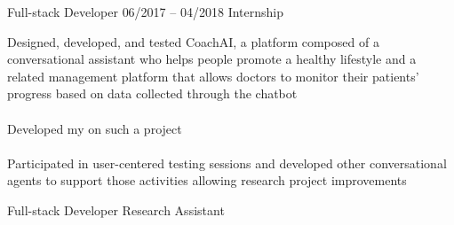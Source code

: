 \documentclass[9pt, green]{template/developercv} %
\begin{document}
{\begin{entrylist}
{		
	   }
		{Full-stack Developer}
	\entry
	{06/2017 -- 04/2018}
	{}
	{Internship}
	{
		\vspace{0.4mm}
		\begin{minipage}[t]{0.75\textwidth} %
			\vspace{-\baselineskip} \small
			\vspace{-2mm}
			\itemmarker Designed, developed, and tested CoachAI, a platform composed of a conversational assistant who helps people promote a healthy lifestyle and a related management platform that allows doctors to monitor their patients' progress based on data collected through the chatbot\\
			\vspace{-3mm}\\
			\itemmarker Developed my  on such a project\\
			\vspace{-3mm}\\
			\itemmarker Participated in user-centered testing sessions and developed other conversational agents to support those activities allowing research project improvements
		\end{minipage}
		
	}
	{Full-stack Developer \space\cpipe\space Research Assistant}
\end{entrylist}


\vspace{-4mm}
\begin{minipage}[t]{0.32\textwidth}
	\vspace{-\baselineskip} %


\end{minipage}}
\end{document}

